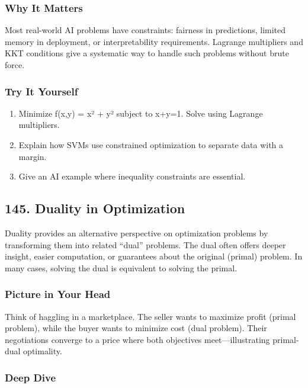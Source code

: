 \documentclass[
  letterpaper,
  DIV=11,
  numbers=noendperiod]{scrreprt}
\providecommand{\tightlist}{%
  \setlength{\itemsep}{0pt}\setlength{\parskip}{0pt}}
\begin{document}
\subsubsection{Why It Matters}\label{why-it-matters-41}

Most real-world AI problems have constraints: fairness in predictions,
limited memory in deployment, or interpretability requirements. Lagrange
multipliers and KKT conditions give a systematic way to handle such
problems without brute force.

\subsubsection{Try It Yourself}\label{try-it-yourself-143}

\begin{enumerate}
\def\labelenumi{\arabic{enumi}.}
\tightlist
\item
  Minimize f(x,y) = x² + y² subject to x+y=1. Solve using Lagrange
  multipliers.
\item
  Explain how SVMs use constrained optimization to separate data with a
  margin.
\item
  Give an AI example where inequality constraints are essential.
\end{enumerate}

\subsection{145. Duality in Optimization}\label{duality-in-optimization}

Duality provides an alternative perspective on optimization problems by
transforming them into related ``dual'' problems. The dual often offers
deeper insight, easier computation, or guarantees about the original
(primal) problem. In many cases, solving the dual is equivalent to
solving the primal.

\subsubsection{Picture in Your Head}\label{picture-in-your-head-144}

Think of haggling in a marketplace. The seller wants to maximize profit
(primal problem), while the buyer wants to minimize cost (dual problem).
Their negotiations converge to a price where both objectives
meet---illustrating primal-dual optimality.

\subsubsection{Deep Dive}\label{deep-dive-144}
\end{document}
